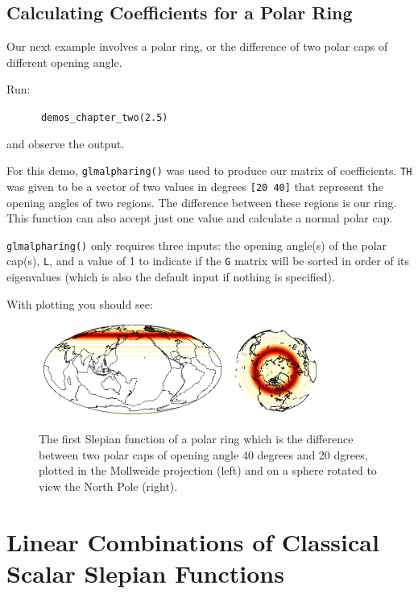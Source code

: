 \documentclass[11pt]{article}
\begin{document}
\subsection{Calculating Coefficients for a Polar Ring}

Our next example involves a polar ring, or the difference of two polar caps of different opening angle. 

Run:

\verb|		demos_chapter_two(2.5)|

and observe the output. 

For this demo, \verb|glmalpharing()| was used to produce our matrix of coefficients. \verb|TH| was given to be a vector of two values in degrees \verb|[20 40]| that represent the opening angles of two regions. The difference between these regions is our ring. This function can also accept just one value and calculate a normal polar cap.

\verb|glmalpharing()| only requires three inputs: the opening angle(s) of the polar cap(s), \verb|L|, and a value of 1 to indicate if the \verb|G| matrix will be sorted in order of its eigenvalues (which is also the default input if nothing is specified). 

With plotting you should see: 

\begin{figure}[H]
  \centering
  \includegraphics[height=1.2in]{figures/figure5A.png}
  \includegraphics[height=1.2in]{figures/figure5B.png}
  \caption{The first Slepian function of a polar ring which is the difference between two polar caps of opening angle 40 degrees and 20 dgrees, plotted in the Mollweide projection (left) and on a sphere rotated to view the North Pole (right).}
\label{figure5}
\end{figure}



\section{Linear Combinations of Classical Scalar Slepian Functions}
\end{document}
